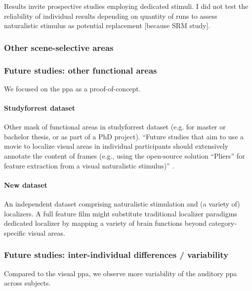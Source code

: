 Results invite prospective studies employing dedicated stimuli.
%
I did not test the reliability of individual results
depending on quantity of runs to assess naturalistic stimulus as potential
replacement [because SRM study].


\subsubsection{Other scene-selective areas}



\subsubsection{Future studies: other functional areas}


We focused on the \ac{ppa} as a proof-of-concept.


\paragraph{Studyforrest dataset}
%
Other mask of functional areas in studyforrest dataset (e.g. for master or
bachelor thesis, or as part of a PhD project).
%
``Future studies that aim to use a movie to localize visual areas in individual
participants should extensively annotate the content of frames (e.g., using the
open-source solution ``Pliers''\citep{mcnamara2017developing} for feature
extraction from a visual naturalistic stimulus)''
\citep{haeusler2022processing}.


\paragraph{New dataset}
%
An independent dataset comprising naturalistic stimulation and (a variety
of) localizers.
%
A full feature film might substitute traditional localizer paradigms dedicated
localizer by mapping a variety of brain functions beyond category-specific
visual areas.


\subsubsection{Future studies: inter-individual differences / variability}
%
Compared to the visual \ac{ppa}, we observe more variability of the auditory
\ac{ppa} across subjects.


